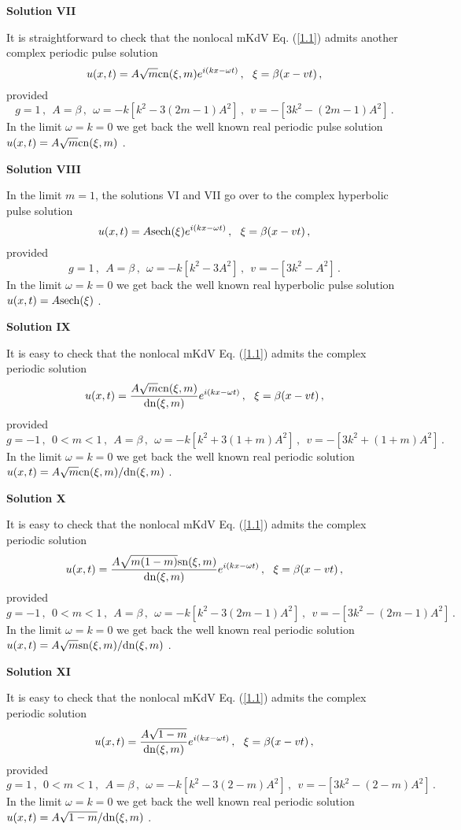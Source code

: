 \documentclass[11pt]{article}
\newcommand{\be}{\begin{equation}}
\newcommand{\ee}{\end{equation}}
\newcommand{\sn}{{\rm sn}}
\newcommand{\dn}{{\rm dn}}
\newcommand{\cn}{{\rm cn}}
\newcommand{\sech}{{\rm sech}}
\begin{document}
{\bf Solution VII}

It is straightforward to check that the nonlocal mKdV Eq. (\ref{1.1}) admits another
complex periodic pulse solution
\be\label{7.9}
u(x,t) = A \sqrt{m} \cn(\xi,m) e^{i(kx-\omega t)}\,,~~\xi = \beta(x-vt)\,,
\ee
provided
\be\label{7.10}
g = 1\,,~~A = \beta\,,~~\omega = -k[k^2-3(2m-1)A^2]\,,~~v = -[3k^2
-(2m-1)A^2]\,.
\ee
In the limit $\omega = k = 0$ we get back the well known real periodic 
pulse solution $u(x,t)=A\sqrt{m} \cn(\xi,m)$ \cite{ks1,ks3}. 

{\bf Solution VIII}

In the limit $m = 1$, the solutions VI and VII go over to the complex 
hyperbolic pulse solution
\be\label{7.11}
u(x,t) = A \sech(\xi) e^{i(kx-\omega t)}\,,~~\xi = \beta(x-vt)\,,
\ee
provided
\be\label{7.12}
g = 1\,,~~A = \beta\,,~~\omega = -k[k^2-3 A^2]\,,~~v = -[3k^2
-A^2]\,.
\ee
In the limit $\omega = k = 0$ we get back the well known real hyperbolic 
pulse solution $u(x,t)=A\sech(\xi)$ \cite{ks1,ks3}.

{\bf Solution IX}

It is easy to check that the nonlocal mKdV Eq. (\ref{1.1}) admits the
complex periodic solution
\be\label{7.13}
u(x,t) = \frac{A \sqrt{m} \cn(\xi,m)}{\dn(\xi,m)} e^{i(kx-\omega t)}\,,
~~\xi = \beta(x-vt)\,,
\ee
provided
\be\label{7.14}
g = -1\,,~~0 < m < 1\,,~~A = \beta\,,~~\omega = -k[k^2+3(1+m)A^2]\,,
~~v = -[3k^2+(1+m)A^2]\,.
\ee
In the limit $\omega = k = 0$ we get back the well known real periodic 
solution $u(x,t)=A\sqrt{m} {\cn(\xi,m)}/{\dn(\xi,m)}$ \cite{ks1,ks3}. 

{\bf Solution X}

It is easy to check that the nonlocal mKdV Eq. (\ref{1.1}) admits the
complex periodic solution
\be\label{7.15}
u(x,t) = \frac{A \sqrt{m(1-m)} \sn(\xi,m)}{\dn(\xi,m)} e^{i(kx-\omega t)}\,,
~~\xi = \beta(x-vt)\,,
\ee
provided
\be\label{7.16}
g = -1\,,~~0 < m < 1\,,~~A = \beta\,,~~\omega = -k[k^2-3(2m-1)A^2]\,,
~~v = -[3k^2-(2m-1)A^2]\,.
\ee
In the limit $\omega = k = 0$ we get back the well known real periodic 
solution $u(x,t)={A\sqrt{m} \sn(\xi,m)}/{\dn(\xi,m)}$ \cite{ks1,ks3}. 

{\bf Solution XI}

It is easy to check that the nonlocal mKdV Eq. (\ref{1.1}) admits the
complex periodic solution
\be\label{7.17}
u(x,t) = \frac{A \sqrt{1-m}}{\dn(\xi,m)} e^{i(kx-\omega t)}\,,
~~\xi = \beta(x-vt)\,,
\ee
provided
\be\label{7.18}
g = 1\,,~~0 < m < 1\,,~~A = \beta\,,~~\omega = -k[k^2-3(2-m)A^2]\,,
~~v = -[3k^2-(2-m)A^2]\,.
\ee
In the limit $\omega = k = 0$ we get back the well known real periodic 
solution $u(x,t)=A\sqrt{1-m}/\dn(\xi,m)$ \cite{ks1,ks3}. 
\end{document}
